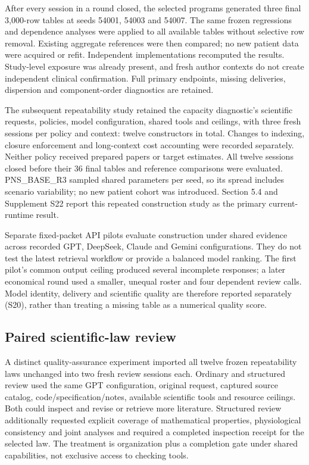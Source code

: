 \documentclass[11pt,letterpaper]{article}
\begin{document}
After every session in a round closed, the selected programs generated three final 3,000-row tables at seeds 54001, 54003 and 54007. The same frozen regressions and dependence analyses were applied to all available tables without selective row removal. Existing aggregate references were then compared; no new patient data were acquired or refit. Independent implementations recomputed the results. Study-level exposure was already present, and fresh author contexts do not create independent clinical confirmation. Full primary endpoints, missing deliveries, dispersion and component-order diagnostics are retained.


The subsequent repeatability study retained the capacity diagnostic's scientific requests, policies, model configuration, shared tools and ceilings, with three fresh sessions per policy and context: twelve constructors in total. Changes to indexing, closure enforcement and long-context cost accounting were recorded separately. Neither policy received prepared papers or target estimates. All twelve sessions closed before their 36 final tables and reference comparisons were evaluated. PNS\_BASE\_R3 sampled shared parameters per seed, so its spread includes scenario variability; no new patient cohort was introduced. Section 5.4 and Supplement S22 report this repeated construction study as the primary current-runtime result.


Separate fixed-packet API pilots evaluate construction under shared evidence across recorded GPT, DeepSeek, Claude and Gemini configurations. They do not test the latest retrieval workflow or provide a balanced model ranking. The first pilot's common output ceiling produced several incomplete responses; a later economical round used a smaller, unequal roster and four dependent review calls. Model identity, delivery and scientific quality are therefore reported separately (S20), rather than treating a missing table as a numerical quality score.


\subsection{Paired scientific-law review}

A distinct quality-assurance experiment imported all twelve frozen repeatability laws unchanged into two fresh review sessions each. Ordinary and structured review used the same GPT configuration, original request, captured source catalog, code/\allowbreak{}specification/\allowbreak{}notes, available scientific tools and resource ceilings. Both could inspect and revise or retrieve more literature. Structured review additionally requested explicit coverage of mathematical properties, physiological consistency and joint analyses and required a completed inspection receipt for the selected law. The treatment is organization plus a completion gate under shared capabilities, not exclusive access to checking tools.
\end{document}
